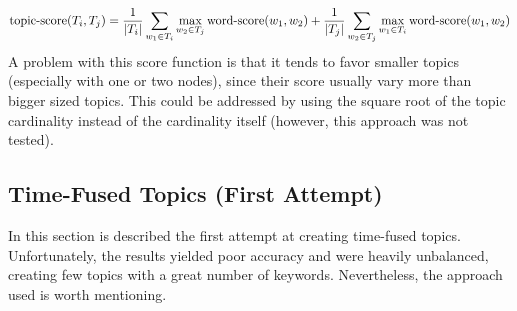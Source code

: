 \begin{description}
	$$
	\mathop{\mathrm{topic\text{-}score}}(T_i,T_j) = \frac{1}{|T_i|}\sum_{w_{1}\in T_i}\max_{w_2\in T_j}\mathop{\mathrm{word\text{-}score}}(w_1,w_2) + \frac{1}{|T_j|}\sum_{w_2\in T_j}\max_{w_1\in T_i} \mathop{\mathrm{word\text{-}score}}(w_1,w_2)
	$$
	A problem  with this score function is that it tends to favor smaller topics (especially with one or two nodes), since their score usually vary more than bigger sized topics. This could be addressed by using the square root of the topic cardinality instead of the cardinality itself (however, this approach was not tested).
\end{description}



\subsection{Time-Fused Topics (First Attempt)}\label{sec:first_attempt}
In this section is described the first attempt at creating time-fused topics. Unfortunately, the results yielded poor accuracy and were heavily unbalanced, creating few topics with a great number of keywords. Nevertheless, the approach used is worth mentioning.

